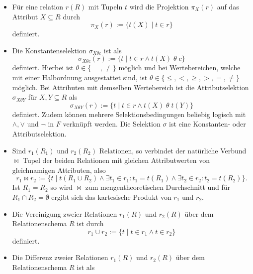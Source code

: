 \begin{itemize}
    \item Für eine relation $r(R)$ mit Tupeln $t$ wird die Projektion $\pi_X(r)$ auf das Attribut $X \subseteq R$ durch
    \begin{equation*}
        \pi_X(r):=\{t(X) \; | \; t \in r \}
    \end{equation*}
    definiert. 
    \item Die Konstantenselektion $\sigma_{X \theta c}$ ist als
    \begin{equation*}
        \sigma_{X \theta c}(r):=\{t \; | \; t \in r \wedge t(X) \; \theta \; c\}
    \end{equation*}
    definiert.
    Hierbei ist $\theta \in \{=, \neq\}$ möglich und bei Wertebereichen, welche mit einer Halbordnung ausgestattet sind, ist $\theta \in \{\leq, <, \geq, >, = ,\neq\}$ möglich. 
    Bei Attributen mit demselben Wertebereich ist die Attributselektion $\sigma_{X \theta Y}$ für $X, Y \subseteq R$ als
    \begin{equation*}
        \sigma_{X \theta Y}(r):=\{t \; | \; t \in r \wedge t(X) \; \theta \; t(Y)\}
    \end{equation*}    
    definiert. Zudem können mehrere Selektionsbedingungen beliebig logisch mit $\wedge, \vee $ und $\neg$ in $F$ verknüpft werden. Die Selektion $\sigma$ ist eine Konstanten- oder Attributselektion.
    \item Sind $r_1(R_1)$ und $r_2(R_2)$ Relationen, so verbindet der natürliche Verbund $\bowtie$ Tupel der beiden Relationen mit gleichen Attributwerten von gleichnamigen Attributen, also 
    \begin{equation*}
        r_1 \bowtie r_2 := \{t \; | \; t(R_1 \cup R_2) \wedge \exists t_1 \in r_1: t_1=t(R_1) \wedge \exists t_2 \in r_2: t_2=t(R_2)\}.
    \end{equation*} Ist $R_1=R_2$ so wird $\bowtie$ zum mengentheoretischen Durchschnitt und für $R_1 \cap R_2=\emptyset$ ergibt sich das kartesische Produkt von $r_1$ und $r_2$.
    \item Die Vereinigung zweier Relationen $r_1(R)$ und $r_2(R)$ über dem Relationenschema $R$ ist durch
    \begin{equation*}
        r_1 \cup r_2:=\{ t \; | \; t \in r_1 \wedge t \in r_2 \}
    \end{equation*}
    definiert.
    \item Die Differenz zweier Relationen $r_1(R)$ und $r_2(R)$ über dem Relationenschema $R$ ist als
    \begin{equation*}

\end{equation*}
\end{itemize}

